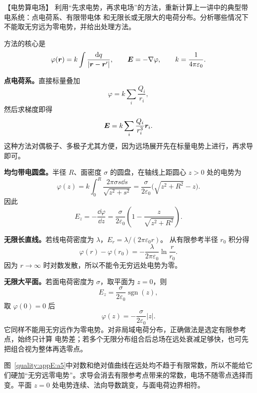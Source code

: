 \begin{origexamplebox}{【电势算电场】}\label{appE:ex:s19-30-1}
利用“先求电势，再求电场”的方法，重新计算上一讲中的典型带电系统：点电荷系、有限带电体
和无限长或无限大的电荷分布。分析哪些情况下不能取无穷远为零电势，并给出处理方法。

\end{origexamplebox}

\begin{xesolution}
方法的核心是
\[
  \varphi(\bm{r})=k\int\frac{\mathop{}\!\mathrm d q}{|\bm{r}-\bm{r}'|},
  \qquad
  \bm{E}=-\nabla\varphi,
  \qquad k=\frac1{4\pi\varepsilon_0}.
\]

\textbf{点电荷系。}直接标量叠加
\[
  \varphi=k\sum_i\frac{Q_i}{r_i},
\]
然后求梯度即得
\[
  \bm{E}=k\sum_i\frac{Q_i}{r_i^3}\bm{r}_i.
\]
这种方法对偶极子、多极子尤其方便，因为远场展开先在标量电势上进行，再求导即可。

\textbf{均匀带电圆盘。}半径 $R$、面密度 $\sigma$ 的圆盘，在轴线上距圆心 $z>0$ 处的电势为
\[
  \varphi(z)=k\int_0^R\frac{2\pi\sigma s\dd s}{\sqrt{z^2+s^2}}
  =\frac{\sigma}{2\varepsilon_0}
  \bigl(\sqrt{z^2+R^2}-z\bigr).
\]
因此
\[
  \boxed{E_z=-\frac{\dd\varphi}{\dd z}
  =\frac{\sigma}{2\varepsilon_0}
  \left(1-\frac{z}{\sqrt{z^2+R^2}}\right)}.
\]

\textbf{无限长直线。}若线电荷密度为 $\lambda$，$E_r=\lambda/(2\pi\varepsilon_0r)$。
从有限参考半径 $r_0$ 积分得
\[
  \boxed{\varphi(r)-\varphi(r_0)
  =-\frac{\lambda}{2\pi\varepsilon_0}\ln\frac r{r_0}}.
\]
因为 $r\to\infty$ 时对数发散，所以不能令无穷远处电势为零。

\textbf{无限大平面。}若面电荷密度为 $\sigma$，取平面为 $z=0$，则
\[
  E_z=\frac{\sigma}{2\varepsilon_0}\operatorname{sgn}(z),
\]
取 $\varphi(0)=0$ 后
\[
  \boxed{\varphi(z)=-\frac{\sigma}{2\varepsilon_0}|z|}.
\]
它同样不能用无穷远作为零电势。对非局域电荷分布，正确做法是选定有限参考点，始终只计算
电势差；若多个无限分布组合后总场在远处衰减足够快，也可先把组合视为整体再选零点。


图~\ref{quality:appE:a5}中对数和绝对值曲线在远处均不趋于有限常数，所以不能给它们硬加“无穷远零电势”。求导会消去有限参考点带来的常数，电场不随零点选择而变。平面 $z=0$ 处电势连续、法向导数跳变，与面电荷边界相符。
\end{xesolution}

